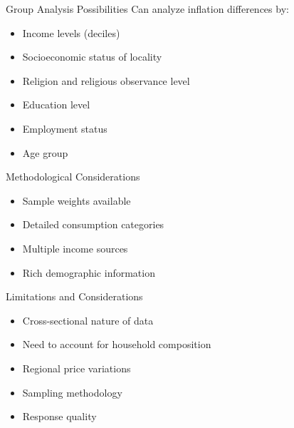 \documentclass{beamer}
\begin{document}
\begin{frame}{Group Analysis Possibilities}
    Can analyze inflation differences by:
    \begin{itemize}
        \item Income levels (deciles)
        \item Socioeconomic status of locality
        \item Religion and religious observance level
        \item Education level
        \item Employment status
        \item Age group
    \end{itemize}
\end{frame}

\begin{frame}{Methodological Considerations}
    \begin{itemize}
        \item Sample weights available
        \item Detailed consumption categories
        \item Multiple income sources
        \item Rich demographic information
    \end{itemize}
\end{frame}

\begin{frame}{Limitations and Considerations}
    \begin{itemize}
        \item Cross-sectional nature of data
        \item Need to account for household composition
        \item Regional price variations
        \item Sampling methodology
        \item Response quality
    \end{itemize}
\end{frame}
\end{document}
